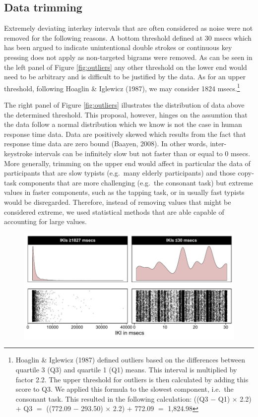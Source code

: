 \documentclass[,man,floatsintext]{apa6}
\let\rmarkdownfootnote\footnote%
\def\footnote{\protect\rmarkdownfootnote}
\begin{document}
\begin{appendix}
\hypertarget{data-trimming}{%
\section{Data trimming}\label{data-trimming}}

Extremely deviating interkey intervals that are often considered as
noise were not removed for the following reasons. A bottom threshold
defined at 30 msecs which has been argued to indicate unintentional
double strokes or continuous key pressing does not apply as non-targeted
bigrams were removed. As can be seen in the left panel of Figure
\ref{fig:outliers} any other threshold on the lower end would need to be
arbitrary and is difficult to be justified by the data. As for an upper
threshold, following Hoaglin \& Iglewicz (1987), we may consider 1824
msecs.\footnote{Hoaglin \& Iglewicz (1987) defined outliers based on the
differences between quartile 3 (Q3) and quartile 1 (Q1) means. This
interval is multiplied by factor 2.2. The upper threshold for outliers
is then calculated by adding this score to Q3. We applied this formula
to the slowest component, i.e.~the consonant task. This resulted in
the following calculation: ((Q3 \(-\) Q1) \(\times\) 2.2) \(+\) Q3
\(=\) ((772.09 \(-\) 293.50) \(\times\) 2.2) + 772.09 \(=\) 1,824.98 }

The right panel of Figure \ref{fig:outliers} illustrates the
distribution of data above the determined threshold. This proposal,
however, hinges on the assumtion that the data follow a normal
distribution which we know is not the case in human response time data.
Data are positively skewed which results from the fact that response
time data are zero bound (Baayen, 2008). In other words, inter-keystroke
intervals can be infinitely slow but not faster than or equal to 0
msecs. More generally, trimming on the upper end would affect in
particular the data of participants that are slow typists (e.g.~many
elderly participants) and those copy-task components that are more
challenging (e.g.~the consonant task) but extreme values in faster
components, such as the tapping task, or in usually fast typists would
be disregarded. Therefore, instead of removing values that might be
considered extreme, we used statistical methods that are able capable of
accounting for large values.

\begin{figure}[!h]

{\centering \includegraphics{ct_files/figure-latex/fig0a-1} 

}
\end{figure}
\end{appendix}
\end{document}
